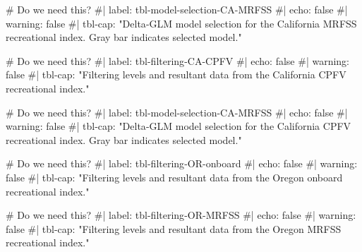 \documentclass[
]{scrartcl}
\newenvironment{Shaded}{\begin{snugshade}}{\end{snugshade}}
\newcommand{\CommentTok}[1]{\textcolor[rgb]{0.37,0.37,0.37}{#1}}
\begin{document}
\begin{Shaded}
\begin{Highlighting}[]
\CommentTok{\# Do we need this?}
\CommentTok{\#| label: tbl{-}model{-}selection{-}CA{-}MRFSS}
\CommentTok{\#| echo: false}
\CommentTok{\#| warning: false}
\CommentTok{\#| tbl{-}cap: "Delta{-}GLM model selection for the California MRFSS recreational index. Gray bar indicates selected model."}
\end{Highlighting}
\end{Shaded}

\begin{Shaded}
\begin{Highlighting}[]
\CommentTok{\# Do we need this?}
\CommentTok{\#| label: tbl{-}filtering{-}CA{-}CPFV}
\CommentTok{\#| echo: false}
\CommentTok{\#| warning: false}
\CommentTok{\#| tbl{-}cap: "Filtering levels and resultant data from the California CPFV recreational index."}
\end{Highlighting}
\end{Shaded}

\begin{Shaded}
\begin{Highlighting}[]
\CommentTok{\# Do we need this?}
\CommentTok{\#| label: tbl{-}model{-}selection{-}CA{-}MRFSS}
\CommentTok{\#| echo: false}
\CommentTok{\#| warning: false}
\CommentTok{\#| tbl{-}cap: "Delta{-}GLM model selection for the California CPFV recreational index. Gray bar indicates selected model."}
\end{Highlighting}
\end{Shaded}

\begin{Shaded}
\begin{Highlighting}[]
\CommentTok{\# Do we need this?}
\CommentTok{\#| label: tbl{-}filtering{-}OR{-}onboard}
\CommentTok{\#| echo: false}
\CommentTok{\#| warning: false}
\CommentTok{\#| tbl{-}cap: "Filtering levels and resultant data from the Oregon onboard recreational index."}
\end{Highlighting}
\end{Shaded}

\begin{Shaded}
\begin{Highlighting}[]
\CommentTok{\# Do we need this?}
\CommentTok{\#| label: tbl{-}filtering{-}OR{-}MRFSS}
\CommentTok{\#| echo: false}
\CommentTok{\#| warning: false}
\CommentTok{\#| tbl{-}cap: "Filtering levels and resultant data from the Oregon MRFSS recreational index."}
\end{Highlighting}
\end{Shaded}
\end{document}
